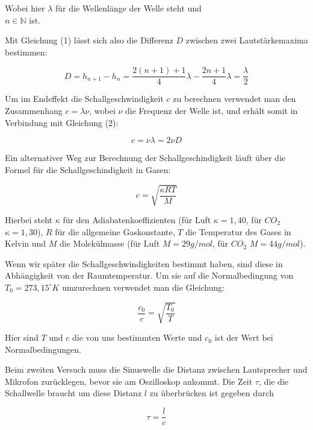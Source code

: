 \documentclass{article}
\begin{document}
Wobei hier $\lambda$ für die Wellenlänge der Welle steht und \\ $n \in \mathbb{N}$ ist.

Mit Gleichung (1) lässt sich also die Differenz $D$ zwischen zwei Lautstärkemaxima bestimmen:

\begin{equation}
    D=h_{n+1} - h_{n} = \frac{2(n+1)+1}{4} \lambda - \frac{2n+1}{4} \lambda = \frac{\lambda}{2} \label{fr:N2}
\end{equation}

Um im Endeffekt die Schallgeschwindigkeit $c$ zu berechnen verwendet man den Zusammenhang $c=\lambda \nu$, wobei $\nu$ die Frequenz der Welle ist, und erhält somit in Verbindung mit Gleichung (2):

\begin{equation}
    c=\nu \lambda = 2 \nu D \label{fr:N3} 
\end{equation}

Ein alternativer Weg zur Berechnung der Schallgeschindigkeit läuft über die Formel für die Schallgeschindigkeit in Gasen:

\begin{equation}
    c = \sqrt{\frac{\kappa R T}{M}} \label{fr:N4}
\end{equation}

Hierbei steht $\kappa$ für den Adiabatenkoeffizienten (für Luft $\kappa = 1,40$, für $CO_2$ $\kappa = 1,30$), $R$ für die allgemeine Gaskonstante, $T$ die Temperatur des Gases in Kelvin und $M$ die Molekülmasse (für Luft $M=29g/mol$, für $CO_2$ $M=44g/mol$).

Wenn wir später die Schallgeschwindigkeiten bestimmt haben, sind diese in Abhängigkeit von der Raumtemperatur. Um sie auf die Normalbedingung von $T_0 = 273,15^{\circ}K$ umzurechnen verwendet man die Gleichung:

\begin{equation}
    \frac{c_0}{c} = \sqrt{\frac{T_0}{T}} \label{fr:N5}
\end{equation}

Hier sind $T$ und $c$ die von uns bestimmten Werte und $c_0$ ist der Wert bei Normalbedingungen.

Beim zweiten Versuch muss die Sinuswelle die Distanz zwischen Lautsprecher und Mikrofon zurücklegen, bevor sie am Oszilloskop ankommt. Die Zeit $\tau$, die die Schallwelle braucht um diese Distanz $l$ zu überbrücken ist gegeben durch

\begin{equation}
    \tau = \frac{l}{c}
\end{equation}
\end{document}
